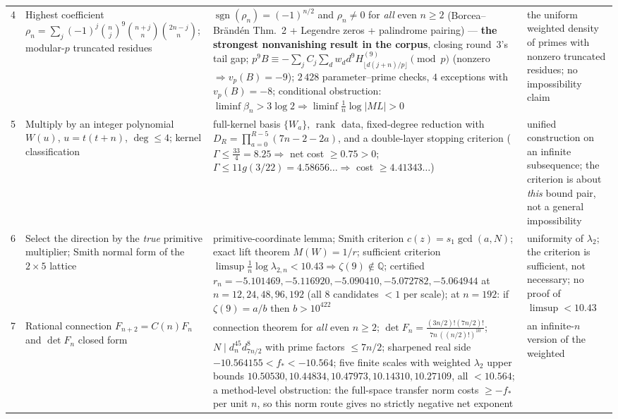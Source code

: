 \documentclass[11pt]{article}
\newcommand{\Q}{\mathbb{Q}}
\begin{document}
\begin{longtable}{@{}p{}p{}p{}p{}@{}}
4 & Highest coefficient $\rho_n=\sum_j(-1)^j\binom nj^9\binom{n+j}{n}\binom{2n-j}{n}$; modular-$p$
    truncated residues & \textcolor{okgreen}{$\operatorname{sgn}(\rho_n)=(-1)^{n/2}$ and
    $\rho_n\ne0$ for \emph{all} even $n\ge2$} (Borcea--Brändén Thm.~2 + Legendre zeros + palindrome
    pairing) --- \textbf{the strongest nonvanishing result in the corpus}, closing round~3's tail gap;
    $p^9B\equiv-\sum_jC_j\sum_dw_dd^9H^{(9)}_{\lfloor d(j+n)/p\rfloor}\pmod p$ (nonzero
    $\Rightarrow v_p(B)=-9$); $2\,428$ parameter--prime checks, $4$ exceptions with $v_p(B)=-8$;
    conditional obstruction: $\liminf\beta_n>3\log2\Rightarrow\liminf\frac1n\log|ML|>0$ & the uniform
    weighted density of primes with nonzero truncated residues; no impossibility claim \\
5 & Multiply by an integer polynomial $W(u)$, $u=t(t+n)$, $\deg\le4$; kernel classification &
    full-kernel basis $\{W_a\}$, $\operatorname{rank}$ data, fixed-degree reduction with
    $D_R=\prod_{a=0}^{R-5}(7n-2-2a)$, and a double-layer stopping criterion
    ($\Gamma\le\frac{33}{4}=8.25\Rightarrow$ net cost $\ge0.75>0$; $\Gamma\le11g(3/22)=4.58656\ldots
    \Rightarrow$ cost $\ge4.41343\ldots$) & \textcolor{gapred}{unified construction on an infinite
    subsequence}; the criterion is about \emph{this} bound pair, not a general impossibility \\
6 & Select the direction by the \emph{true} primitive multiplier; Smith normal form of the $2\times5$
    lattice & primitive-coordinate lemma; Smith criterion $c(z)=s_1\gcd(a,N)$; exact lift theorem
    $M(W)=1/r$; sufficient criterion $\limsup\frac1n\log\lambda_{2,n}<10.43\Rightarrow\zeta(9)\notin\Q$;
    certified $r_n=-5.101469,-5.116920,-5.090410,-5.072782,-5.064944$ at $n=12,24,48,96,192$
    (all $8$ candidates $<1$ per scale); at $n=192$: if $\zeta(9)=a/b$ then $b>10^{422}$ &
    uniformity of $\lambda_2$; the criterion is sufficient, not necessary; no proof of
    $\limsup<10.43$ \\
7 & Rational connection $F_{n+2}=C(n)F_n$ and $\det F_n$ closed form & connection theorem for
    \emph{all} even $n\ge2$; $\det F_n=\frac{(3n/2)!(7n/2)!}{7n\,((n/2)!)^{10}}$;
    $N\mid d_n^{45}d_{7n/2}^{8}$ with prime factors $\le7n/2$; sharpened real side
    $-10.564155<f_*<-10.564$; five finite scales with weighted $\lambda_2$ upper bounds
    $10.50530,10.44834,10.47973,10.14310,10.27109$, all $<10.564$; \textcolor{gapred}{a
    method-level obstruction}: the full-space transfer norm costs $\ge-f_*$ per unit $n$, so this
    norm route gives no strictly negative net exponent & an infinite-$n$ version of the weighted

\end{longtable}
\end{document}
